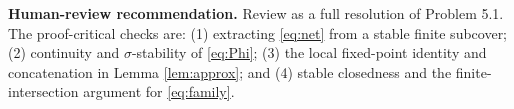 \documentclass[11pt]{article}
\begin{document}
\medskip
\noindent\textbf{Human-review recommendation.}
Review as a full resolution of Problem 5.1.  The proof-critical checks are:
(1) extracting \eqref{eq:net} from a stable finite subcover; (2) continuity
and $\sigma$-stability of \eqref{eq:Phi}; (3) the local fixed-point identity
and concatenation in Lemma \ref{lem:approx}; and (4) stable closedness and
the finite-intersection argument for \eqref{eq:family}.
\end{document}

